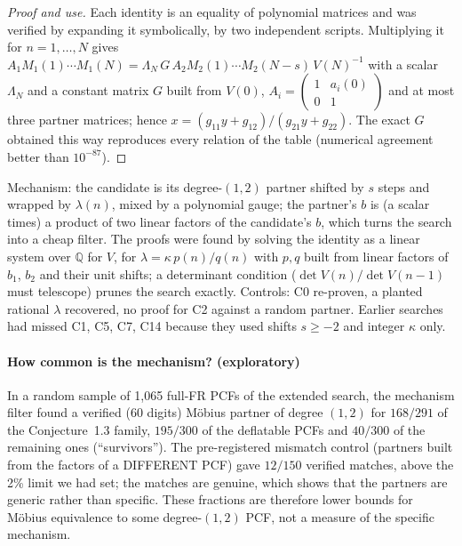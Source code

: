 \documentclass[11pt]{article}
\begin{document}
\begin{proof}[Proof and use]
Each identity is an equality of polynomial matrices and was verified by expanding it symbolically, by two independent scripts.
Multiplying it for $n=1,\dots,N$ gives $A_1M_1(1)\cdots M_1(N)=\Lambda_N\,G\,A_2M_2(1)\cdots M_2(N-s)\,V(N)^{-1}$ with a scalar
$\Lambda_N$ and a constant matrix $G$ built from $V(0)$, $A_i=\left(\begin{smallmatrix}1&a_i(0)\\0&1\end{smallmatrix}\right)$ and at
most three partner matrices; hence $x=(g_{11}y+g_{12})/(g_{21}y+g_{22})$. The exact $G$ obtained this way reproduces every relation
of the table (numerical agreement better than $10^{-87}$).
\end{proof}
Mechanism: the candidate is its degree-$(1,2)$ partner shifted by $s$ steps and wrapped by $\lambda(n)$, mixed by a polynomial
gauge; the partner's $b$ is (a scalar times) a product of two linear factors of the candidate's $b$, which turns the search into a
cheap filter. The proofs were found by solving the identity as a linear system over $\mathbb Q$ for $V$, for $\lambda=\kappa\,p(n)/q(n)$
with $p,q$ built from linear factors of $b_1$, $b_2$ and their unit shifts; a determinant condition ($\det V(n)/\det V(n-1)$ must
telescope) prunes the search exactly. Controls: C0 re-proven, a planted rational $\lambda$ recovered, no proof for C2 against a
random partner. Earlier searches had missed C1, C5, C7, C14 because they used shifts $s\ge-2$ and integer $\kappa$ only.

\paragraph{How common is the mechanism? (exploratory)} In a random sample of 1{,}065 full-FR PCFs of the extended search, the
mechanism filter found a verified (60 digits) M\"obius partner of degree $(1,2)$ for $168/291$ of the Conjecture~1.3 family,
$195/300$ of the deflatable PCFs and $40/300$ of the remaining ones (``survivors'').
The pre-registered mismatch control (partners built from the factors of a DIFFERENT PCF) gave $12/150$ verified matches, above
the 2\% limit we had set; the matches are genuine, which shows that the partners are generic rather than specific. These
fractions are therefore lower bounds for M\"obius equivalence to some degree-$(1,2)$ PCF, not a measure of the specific mechanism.
\end{document}
